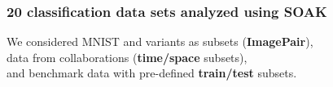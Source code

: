 \documentclass[t]{beamer}
\begin{document}
\begin{frame}
  \frametitle{20 classification data sets analyzed using SOAK} We
  considered MNIST and variants as subsets (\textbf{ImagePair}),\\
  data from collaborations (\textbf{time/space} subsets), \\
  and benchmark data with
  pre-defined \textbf{train/test} subsets.  \scriptsize



\end{frame}
\end{document}
